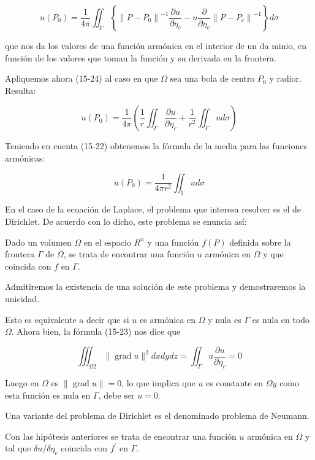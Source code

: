 \documentclass[10pt]{article}
\theoremstyle{plain}
\theoremstyle{definition}
\theoremstyle{remark}
\begin{document}
\begin{equation*}
u\left(P_{0}\right)=\frac{1}{4 \pi} \iint_{\Gamma}\left\{\left\|P-P_{0}\right\|^{-1} \frac{\partial u}{\partial \eta_{e}}-u \frac{\partial}{\partial \eta_{e}}\left\|P-P_{c}\right\|^{-1}\right\} d \sigma \tag{$15\cdot-24$}
\end{equation*}


que nos da los valores de una función armónica en el interior de un da minio, en función de los valores que toman la función y su derivada en la frontera.

Apliquemos ahora (15-24) al caso en que $\Omega$ sea una bola de centro $P_{0}$ y radior. Resulta:

$$
u\left(P_{0}\right)=\frac{1}{4 \pi}\left(\frac{1}{r} \iint_{\Gamma} \frac{\partial u}{\partial \eta_{c}}+\frac{1}{r^{2}} \iint_{\Gamma} u d \sigma\right)
$$

Teniendo en cuenta (15-22) obtenemos la fórmula de la media para las funciones armónicas:

$$
u\left(P_{0}\right)=\frac{1}{4 \pi r^{2}} \iint_{1} u d \sigma
$$

En el caso de la ecuación de Laplace, el problema que interesa resolver es el de Dirichlet. De acuerdo con lo dicho, este problema se enuncia así:

Dado un volumen $\Omega$ en el espacio $R^{n}$ y una función $f(P)$ definida sobre la frontera $\Gamma$ de $\Omega$, se trata de encontrar una función $u$ armónica en $\Omega$ y que coincida con $f$ en $\Gamma$.

Admitiremos la existencia de una solución de este problema y demostraremos la unicidad.

Esto es equivalente a decir que si $u$ es armónica en $\Omega$ y nula es $\Gamma$ es nula en todo $\Omega$. Ahora bien, la fórmula (15-23) nos dice que


\begin{equation*}
\iiint_{\Omega 2}\|\operatorname{grad} u\|^{2} d x d y d z=\iint_{\Gamma} u \frac{\partial u}{\partial \eta_{c}}=0 \tag{15-25}
\end{equation*}


Luego en $\Omega$ es $\|\operatorname{grad} u\|=0$, lo que implica que $u$ es constante en $\Omega y$ como esta función es nula en $\Gamma$, debe ser $u=0$.

Una variante del problema de Dirichlet es el denominado problema de Neumann.

Con las hipótesis anteriores se trata de encontrar una función $u$ armónica en $\Omega$ y tal que $\delta u / \delta \eta_{e}$ coincida con $f^{\prime}$ en $\Gamma$.
\end{document}
